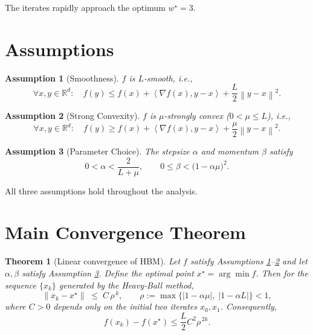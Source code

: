 \documentclass{article}
\newtheorem{theorem}{Theorem}
\newtheorem{assumption}{Assumption}
\newcommand{\norm}[1]{\left\lVert#1\right\rVert}
\newcommand{\inner}[2]{\left\langle #1,#2\right\rangle}
\newcommand{\R}{\mathbb{R}}
\begin{document}
The iterates rapidly approach the optimum $w^$.

\newpage
\section*{Assumptions}
\begin{assumption}[Smoothness]\label{as:smooth}
$f$ is $L$‑smooth, i.e.,
\[
\forall x,y\in\R^{d}:\quad
f(y)\le f(x)+\inner{\nabla f(x)}{y-x}+\frac{L}{2}\norm{y-x}^{2}.
\]
\end{assumption}
\begin{assumption}[Strong Convexity]\label{as:strong}
$f$ is $\mu$‑strongly convex ($0<\mu\le L$), i.e.,
\[
\forall x,y\in\R^{d}:\quad
f(y)\ge f(x)+\inner{\nabla f(x)}{y-x}+\frac{\mu}{2}\norm{y-x}^{2}.
\]
\end{assumption}
\begin{assumption}[Parameter Choice]\label{as:param}
The stepsize $\alpha$ and momentum $\beta$ satisfy
\[
0<\alpha<\frac{2}{L+\mu},\qquad
0\le\beta<\bigl(1-\alpha\mu\bigr)^{2}.
\]
\end{assumption}
All three assumptions hold throughout the analysis.

\section*{Main Convergence Theorem}
\begin{theorem}[Linear convergence of HBM]\label{thm:linear}
Let $f$ satisfy Assumptions \ref{as:smooth}–\ref{as:strong} and let $\alpha,\beta$ satisfy Assumption \ref{as:param}.  
Define the optimal point $x^\star=\arg\min f$.  
Then for the sequence $\{x_k\}$ generated by the Heavy‑Ball method,
\[
\boxed{
\norm{x_k-x^\star}\;\le\;C\,\rho^{\,k},\qquad
\rho:=\max\bigl\{|1-\alpha\mu|,\;|1-\alpha L|\bigr\}<1,
}
\]
where $C>0$ depends only on the initial two iterates $x_0,x_1$. Consequently,
\[
f(x_k)-f(x^\star)\le \frac{L}{2}C^{2}\rho^{\,2k}.
\]
\end{theorem}
\end{document}
